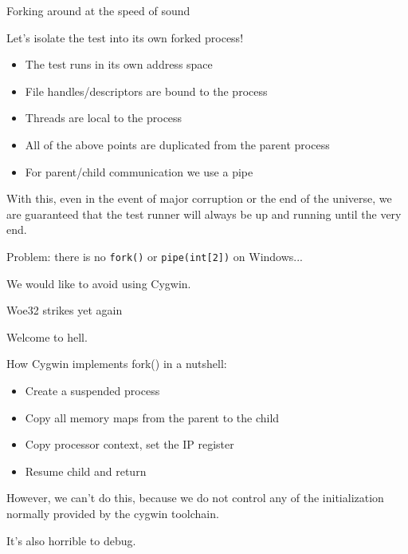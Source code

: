 \documentclass[10pt]{beamer}
\begin{document}
\begin{frame}[fragile]{Forking around at the speed of sound}

  Let's isolate the test into its own forked process!

  \begin{itemize}
    \item The test runs in its own address space
    \item File handles/descriptors are bound to the process
    \item Threads are local to the process
    \item All of the above points are duplicated from the parent process
    \item For parent/child communication we use a pipe
  \end{itemize}

  With this, even in the event of major corruption or the end of the universe,
  we are guaranteed that the test runner will always be up and running until
  the very end.

  \pause{}

  Problem: there is no \verb|fork()| or \verb|pipe(int[2])| on Windows...

  We would like to avoid using Cygwin.

\end{frame}

\begin{frame}[fragile]{Woe32 strikes yet again}

  Welcome to hell.

  How Cygwin implements fork() in a nutshell:
  \begin{itemize}
    \item Create a suspended process
    \item Copy all memory maps from the parent to the child
    \item Copy processor context, set the IP register
    \item Resume child and return
  \end{itemize}

  \pause{}

  However, we can't do this, because we do not control any of the initialization
  normally provided by the cygwin toolchain.

  It's also horrible to debug.

\end{frame}
\end{document}
